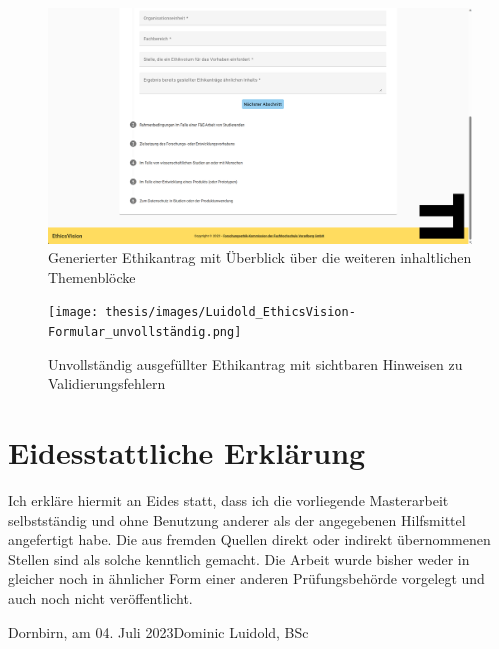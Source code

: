 \documentclass[a4paper,12pt,twoside,numbers=noendperiod]{scrreprt}
\begin{document}
\begin{figure}[ht]
    \centering
    \includegraphics[width=\linewidth]{thesis/images/Luidold_EthicsVision-Formular_Ende.png}
    \caption{Generierter Ethikantrag mit Überblick über die weiteren inhaltlichen Themenblöcke}
    \label{fig:ethics-vision-formular-ende}
\end{figure}

\begin{figure}[ht]
    \centering
    \texttt{[image: thesis/images/Luidold\_EthicsVision-Formular\_unvollständig.png]}
    \caption{Unvollständig ausgefüllter Ethikantrag mit sichtbaren Hinweisen zu Validierungsfehlern}
    \label{fig:ethics-vision-formular-unvollständig}
\end{figure}

\cleardoublepage
\chapter*{Eidesstattliche Erklärung}

Ich erkläre hiermit an Eides statt, dass ich die vorliegende Masterarbeit selbstständig und ohne Benutzung anderer als der angegebenen Hilfsmittel angefertigt habe. Die aus fremden Quellen direkt oder indirekt übernommenen Stellen sind als solche kenntlich gemacht. Die Arbeit wurde bisher weder in gleicher noch in ähnlicher Form einer anderen Prüfungsbehörde vorgelegt und auch noch nicht veröffentlicht.

\vspace{5cm}
\noindent
Dornbirn, am 04. Juli 2023\hfill Dominic Luidold, BSc
\end{document}
